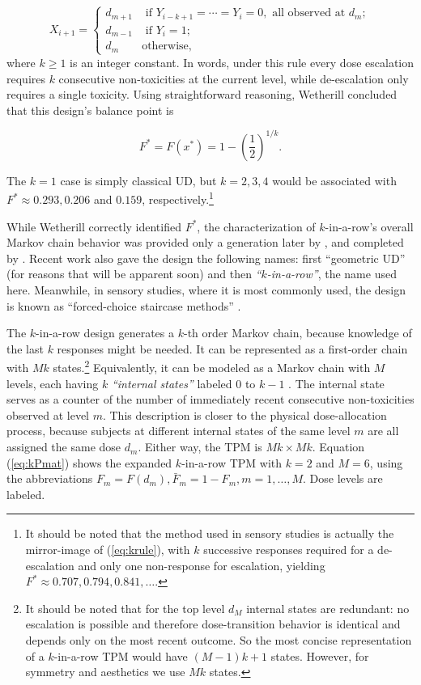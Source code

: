 \begin{equation}\label{eq:krule}
 X_{i+1}=
 \begin{cases}
d_{m+1} &\textrm{ if $Y_{i-k+1}=\cdots=Y_i=0$}, \textrm{ all observed at $d_m$};\\
d_{m-1} &\textrm{ if $Y_i=1$}; \\
d_m &\textrm{otherwise},
 \end{cases}
\end{equation}
\noindent where $k\geq 1$ is an integer constant. In words, under this rule every dose escalation requires $k$ consecutive non-toxicities at the current level, while de-escalation only requires a single toxicity. Using straightforward reasoning, Wetherill concluded that this design's balance point is

\begin{equation}\label{eq:krtarget}
 F^*=F\left(x^*\right)=1-\left(\frac {1}{2}\right)^{1/k}.
\end{equation}

\noindent The $k=1$ case is simply classical UD, but $k=2,3,4$ would be associated with $F^*\approx 0.293,0.206$ and $0.159$, respectively.\footnote{It should be noted that the method used in sensory studies is actually the mirror-image of (\ref{eq:krule}), with $k$ successive responses required for a de-escalation and only one non-response for escalation, yielding $F^*\approx 0.707,0.794,0.841,\ldots$.}

While Wetherill correctly identified $F^*$, the characterization of $k$-in-a-row's overall Markov chain behavior was provided only a generation later by \cite{Gezm:Geom:1996}, and completed by \cite{Oron:Hoff:thek:2009}. Recent work also gave the design the following names: first ``geometric UD'' (for reasons that will be apparent soon) and then \emph{``$k$-in-a-row''}\citep{Ivan:Mont:Moha:Durh:impr:2003}, the name used here. Meanwhile, in sensory studies, where it is most commonly used, the design is known as ``forced-choice staircase methods'' \citep{Treu:Mini:1995}.

The $k$-in-a-row design generates a $k$-th order Markov chain, because knowledge of the last $k$ responses might be needed. It can be represented as a first-order chain with $Mk$ states.\footnote{It should be noted that for the top level $d_M$ internal states are redundant: no escalation is possible and therefore dose-transition behavior is identical and depends only on the most recent outcome. So the most concise representation of a $k$-in-a-row TPM would have $(M-1)k+1$ states. However, for symmetry and aesthetics we use $Mk$ states.} Equivalently,  it can be modeled as a Markov chain with $M$ levels, each having $k$ \emph{``internal states''} labeled $0$ to $k-1$ \citep{Oron:Hoff:thek:2009,Weiss:Aspe:1994}. The internal state serves as a counter of the number of immediately recent consecutive non-toxicities observed at level $m$. This description is closer to the physical dose-allocation process, because subjects at different internal states of the same level $m$ are all assigned the same dose $d_m$. Either way, the TPM is $Mk\times Mk$. Equation (\ref{eq:kPmat}) shows the expanded $k$-in-a-row TPM with $k=2$ and $M=6$, using the abbreviations $F_m=F\left(d_m\right),\bar{F}_m=1-F_m, m=1,\ldots,M$. Dose levels are labeled.

